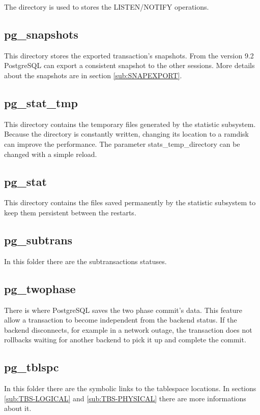 The directory is used to stores the LISTEN/NOTIFY operations.

\subsection{pg\_snapshots}

This directory stores the exported transaction's snapshots. From the version
9.2 PostgreSQL can export a consistent snapshot to the other sessions. More
details about the snapshots are in section \ref{sub:SNAPEXPORT}.

\subsection{pg\_stat\_tmp}

This directory contains the temporary files generated by the statistic
subsystem. Because the directory is constantly written, changing its location
to a ramdisk can improve the performance. The parameter stats\_temp\_directory
can be changed with a simple reload.

\subsection{pg\_stat}

This directory contains the files saved permanently by the statistic subsystem
to keep them persistent between the restarts.

\subsection{pg\_subtrans}

In this folder there are the subtransactions statuses.

\subsection{pg\_twophase}

There is where PostgreSQL saves the two phase commit's data. This feature allow
a transaction to become independent from the backend status. If the backend
disconnects, for example in a network outage, the transaction does not
rollbacks waiting for another backend to pick it up and complete the commit.

\subsection{pg\_tblspc}

\label{sub:TABLESPACE}

In this folder there are the symbolic links to the tablespace locations. In
sections \ref{sub:TBS-LOGICAL} and \ref{sub:TBS-PHYSICAL} there are more informations
about it.
